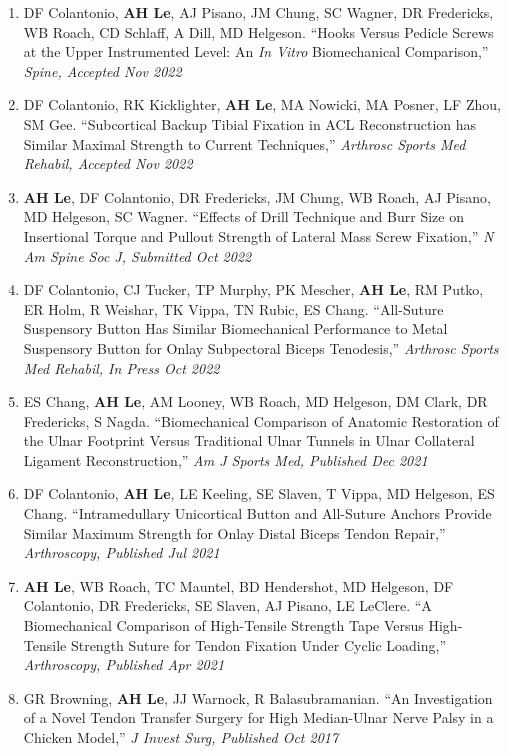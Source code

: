 \documentclass[10pt]{letter}
\begin{document}
\begin{justify}
\begin{enumerate}[leftmargin=*]
    \item DF Colantonio, \textbf{AH Le}, AJ Pisano, JM Chung, SC Wagner, DR Fredericks, WB Roach, CD Schlaff, A Dill, MD Helgeson.
        ``Hooks Versus Pedicle Screws at the Upper Instrumented Level: An \textit{In Vitro} Biomechanical Comparison,''
        \textit{Spine, Accepted Nov 2022}
    
    \item DF Colantonio, RK Kicklighter, \textbf{AH Le}, MA Nowicki, MA Posner, LF Zhou, SM Gee.
        ``Subcortical Backup Tibial Fixation in ACL Reconstruction has Similar Maximal Strength to Current Techniques,''
        \textit{Arthrosc Sports Med Rehabil, Accepted Nov 2022}
        
    \item \textbf{AH Le}, DF Colantonio, DR Fredericks, JM Chung, WB Roach, AJ Pisano, MD Helgeson, SC Wagner.
        ``Effects of Drill Technique and Burr Size on Insertional Torque and Pullout Strength of Lateral Mass Screw Fixation,''
        \textit{N Am Spine Soc J, Submitted Oct 2022}
        
    \item DF Colantonio, CJ Tucker, TP Murphy, PK Mescher, \textbf{AH Le}, RM Putko, ER Holm, R Weishar, TK Vippa, TN Rubic, ES Chang.
        ``All-Suture Suspensory Button Has Similar Biomechanical Performance to Metal Suspensory Button for Onlay Subpectoral Biceps Tenodesis,''
        \textit{Arthrosc Sports Med Rehabil, In Press Oct 2022}
    
    \item ES Chang, \textbf{AH Le}, AM Looney, WB Roach, MD Helgeson, DM Clark, DR Fredericks, S Nagda.
        ``Biomechanical Comparison of Anatomic Restoration of the Ulnar Footprint Versus Traditional Ulnar Tunnels in Ulnar Collateral Ligament Reconstruction,''
        \textit{Am J Sports Med, Published Dec 2021}
    
    \item DF Colantonio, \textbf{AH Le}, LE Keeling, SE Slaven, T Vippa, MD Helgeson, ES Chang.
        ``Intramedullary Unicortical Button and All-Suture Anchors Provide Similar Maximum Strength for Onlay Distal Biceps Tendon Repair,''
        \textit{Arthroscopy, Published Jul 2021}
    
    \item \textbf{AH Le}, WB Roach, TC Mauntel, BD Hendershot, MD Helgeson, DF Colantonio, DR Fredericks, SE Slaven, AJ Pisano, LE LeClere. 
        ``A Biomechanical Comparison of High-Tensile Strength Tape Versus High-Tensile Strength Suture for Tendon Fixation Under Cyclic Loading,''
        \textit{Arthroscopy, Published Apr 2021}
    
    \item GR Browning, \textbf{AH Le}, JJ Warnock, R Balasubramanian.
        ``An Investigation of a Novel Tendon Transfer Surgery for High Median-Ulnar Nerve Palsy in a Chicken Model,''
        \textit{J Invest Surg, Published Oct 2017}
\end{enumerate}
\end{justify}
\end{document}
